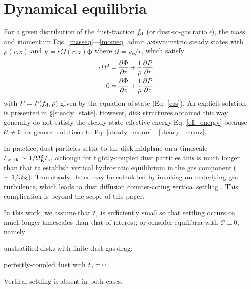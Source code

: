 \section{Dynamical equilibria}\label{eqm}
 
For a given distribution of the dust-fraction $f_\mathrm{d}$ (or
dust-to-gas ratio $\epsilon$), the 
mass and momentum Eqs. \ref{masseq}---\ref{momeq} admit     
axisymmetric steady states with $\rho(r,z)$ and 
$\bm{v}=r\Omega(r,z)\hat{\bm{\phi}}$ where $\Omega = v_\phi/r$, which satisfy 
\begin{align}
  r\Omega^2 &= \frac{\partial \Phi}{\partial r} + \frac{1}{\rho}\frac{\partial P}{\partial
    r},\label{steady_momr}\\
  0 & = \frac{\partial\Phi}{\partial z} + \frac{1}{\rho}\frac{\partial P}{\partial z},\label{steady_momz}
\end{align}
with $P=P(f_\mathrm{d},\rho)$ given by the equation of state
(Eq. \ref{eos}). An explicit solution is presented in
\S\ref{steady_state}.  
However, disk structures obtained this way generally do not satisfy 
the steady state effective energy Eq. \ref{eff_energy} because
$\mathcal{C}\neq0$ for general solutions to
Eq. \ref{steady_momr}---\ref{steady_momz}. 

In practice, dust particles settle to the disk midplane on a timescale 
$t_\mathrm{settle}\sim 1/\Omega_{\rm K}^2t_\mathrm{s}$, although for tightly-coupled dust
particles this is much longer than that to establish vertical
hydrostatic equilibrium in the gas component ($\sim 1/\Omega_{\rm K}$).  
True steady states may be calculated by invoking an underlying gas
turbulence, which leads to dust diffusion counter-acting vertical
settling \citep{takeuchi02, youdin07}. This complication is beyond the
scope of this paper.  

In this work, we assume that $t_\mathrm{s}$  is sufficiently small so
that settling occurs on much longer timescales  than that of interest; or
consider equilibria with $\mathcal{C}\equiv 0$, namely   
\begin{inparaenum}[1)] 
\item 
  unstratified disks with finite dust-gas drag; %
\item 
  perfectly-coupled dust with $t_\mathrm{s}=0$. %
\end{inparaenum} 
Vertical settling is absent in both cases. 


